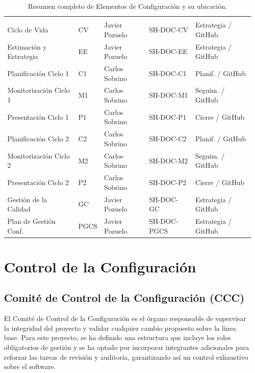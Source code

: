 \documentclass[11pt,a4paper]{article}
\begin{document}
\begin{table}[H]
\begin{tabularx}{\textwidth}{@{}l l l l L@{}}
\midrule
{}  \\
Ciclo de Vida & CV & Javier Pozuelo & SH-DOC-CV & Estrategia / GitHub \\
Estimación y Estrategia & EE & Javier Pozuelo & SH-DOC-EE & Estrategia / GitHub \\
Planificación Ciclo 1 & C1 & Carlos Sobrino & SH-DOC-C1 & Planif. / GitHub \\
Monitorización Ciclo 1 & M1 & Carlos Sobrino & SH-DOC-M1 & Seguim. / GitHub \\
Presentación Ciclo 1 & P1 & Carlos Sobrino & SH-DOC-P1 & Cierre / GitHub \\
Planificación Ciclo 2 & C2 & Carlos Sobrino & SH-DOC-C2 & Planif. / GitHub \\
Monitorización Ciclo 2 & M2 & Carlos Sobrino & SH-DOC-M2 & Seguim. / GitHub \\
Presentación Ciclo 2 & P2 & Carlos Sobrino & SH-DOC-P2 & Cierre / GitHub \\
Gestión de la Calidad & GC & Javier Pozuelo & SH-DOC-GC & Estrategia / GitHub \\
Plan de Gestión Conf. & PGCS & Javier Pozuelo & SH-DOC-PGCS & Estrategia / GitHub \\
\bottomrule
\end{tabularx}
\caption{Resumen completo de Elementos de Configuración y su ubicación.}
\end{table}

\section{Control de la Configuración}

\subsection{Comité de Control de la Configuración (CCC)}

El Comité de Control de la Configuración es el órgano responsable de supervisar la integridad del proyecto y validar cualquier cambio propuesto sobre la línea base. Para este proyecto, se ha definido una estructura que incluye los roles obligatorios de gestión y se ha optado por incorporar integrantes adicionales para reforzar las tareas de revisión y auditoría, garantizando así un control exhaustivo sobre el software.
\end{document}
